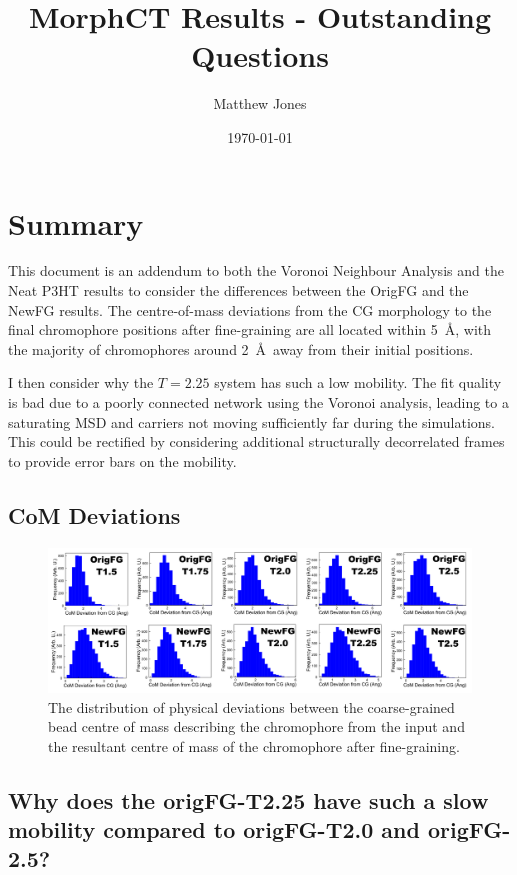 \documentclass[12pt]{article}
\title{MorphCT Results - Outstanding Questions}
\author{Matthew Jones}
\date{\today}
\begin{document}
\maketitle

\section{Summary}

This document is an addendum to both the Voronoi Neighbour Analysis and the Neat P3HT results to consider the differences between the OrigFG and the NewFG results.
The centre-of-mass deviations from the CG morphology to the final chromophore positions after fine-graining are all located within 5~\AA, with the majority of chromophores around 2~\AA~away from their initial positions.

I then consider why the $T = 2.25$ system has such a low mobility.
The fit quality is bad due to a poorly connected network using the Voronoi analysis, leading to a saturating MSD and carriers not moving sufficiently far during the simulations.
This could be rectified by considering additional structurally decorrelated frames to provide error bars on the mobility.

\subsection{CoM Deviations}

\begin{figure}[h!]\centering
	\includegraphics[width=\textwidth]{Figures/CoMDeviation.pdf}
    \caption{The distribution of physical deviations between the coarse-grained bead centre of mass describing the chromophore from the input and the resultant centre of mass of the chromophore after fine-graining.}
	\label{fig:Deviation}
\end{figure}

\clearpage

\subsection{Why does the origFG-T2.25 have such a slow mobility compared to origFG-T2.0 and origFG-2.5?}
\end{document}
